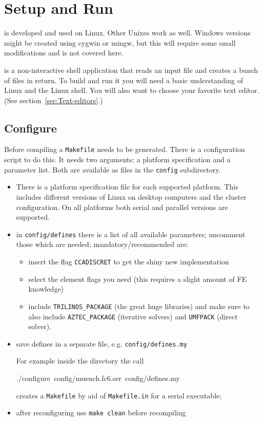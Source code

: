 \section{Setup and Run}

\ccarat{} is developed and used on Linux. Other Unixes work as well.
Windows versions might be created using cygwin or mingw, but this
will require some small modifications and is not covered here.

\ccarat{} is a non-interactive shell application that reads an input
file and creates a bunch of files in return. To build and run it you
will need a basic understanding of Linux and the Linux shell. You
will also want to choose your favorite text editor. (See section~\ref{sec:Text-editors}.)


\subsection{Configure}

Before compiling a \texttt{Makefile} needs to be generated. There
is a configuration script to do this. It needs two arguments: a platform
specification and a parameter list. Both are available as files in
the \texttt{config} subdirectory.

\begin{itemize}
\item There is a platform specification file for each supported platform.
This includes different versions of Linux on desktop computers and
the cluster configuration. On all platforms both serial and parallel
versions are supported.
\item in \texttt{config/defines} there is a list of all available parameters;
uncomment those which are needed; mandatory/recommended are:

\begin{itemize}
\item insert the flag \texttt{CCADISCRET} to get the shiny new
implementation
\item select the element flags you need (this requires a slight amount
of FE knowledge)
\item include \texttt{TRILINOS\_PACKAGE} (the
great huge libraries) and make sure to also include
\texttt{AZTEC\_PACKAGE} (iterative solvers) and \texttt{UMFPACK}
(direct solver).
\end{itemize}
\item save defines in a separate file, e.g. \texttt{config/defines.my}


For example inside the \ccarat{} directory the call

\begin{lyxcode}
./configure~config/muench.fc6.ser~config/defines.my~
\end{lyxcode}
creates a \texttt{Makefile} by aid of \texttt{Makefile.in} for a serial
executable;

\item after reconfiguring use \texttt{make clean} before recompiling
\end{itemize}

